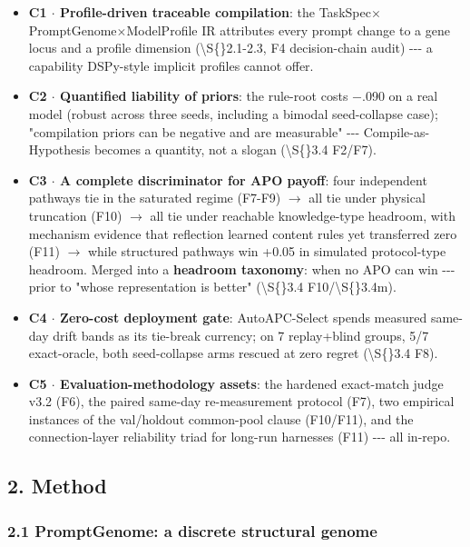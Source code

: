 \begin{itemize}
\tightlist
\item
  \textbf{C1 \(\cdot\) Profile-driven traceable compilation}: the TaskSpec\(\times\)PromptGenome\(\times\)ModelProfile IR attributes every prompt change to a gene locus and a profile dimension (\textbackslash S\{\}2.1-2.3, F4 decision-chain audit) -\/-\/- a capability DSPy-style implicit profiles cannot offer.
\item
  \textbf{C2 \(\cdot\) Quantified liability of priors}: the rule-root costs \(-\).090 on a real model (robust across three seeds, including a bimodal seed-collapse case); "compilation priors can be negative and are measurable" -\/-\/- Compile-as-Hypothesis becomes a quantity, not a slogan (\textbackslash S\{\}3.4 F2/F7).
\item
  \textbf{C3 \(\cdot\) A complete discriminator for APO payoff}: four independent pathways tie in the saturated regime (F7-F9) \(\rightarrow\) all tie under physical truncation (F10) \(\rightarrow\) all tie under reachable knowledge-type headroom, with mechanism evidence that reflection learned content rules yet transferred zero (F11) \(\rightarrow\) while structured pathways win +0.05 in simulated protocol-type headroom. Merged into a \textbf{headroom taxonomy}: when no APO can win -\/-\/- prior to "whose representation is better" (\textbackslash S\{\}3.4 F10/\textbackslash S\{\}3.4m).
\item
  \textbf{C4 \(\cdot\) Zero-cost deployment gate}: AutoAPC-Select spends measured same-day drift bands as its tie-break currency; on 7 replay+blind groups, 5/7 exact-oracle, both seed-collapse arms rescued at zero regret (\textbackslash S\{\}3.4 F8).
\item
  \textbf{C5 \(\cdot\) Evaluation-methodology assets}: the hardened exact-match judge v3.2 (F6), the paired same-day re-measurement protocol (F7), two empirical instances of the val/holdout common-pool clause (F10/F11), and the connection-layer reliability triad for long-run harnesses (F11) -\/-\/- all in-repo.
\end{itemize}

\subsection{2. Method}\label{2-method}

\subsubsection{2.1 PromptGenome: a discrete structural genome}\label{21-promptgenome-a-discrete-structural-genome}

